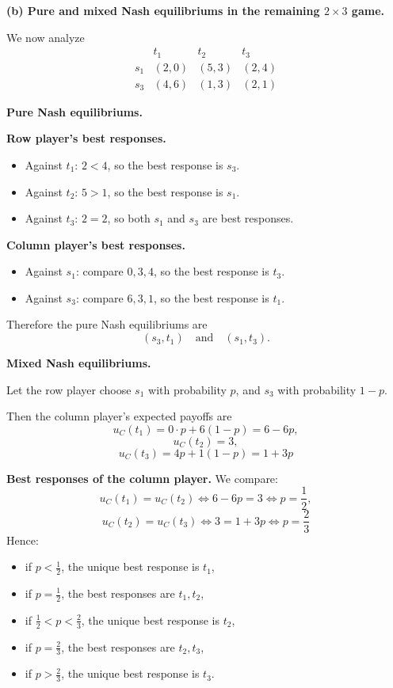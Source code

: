 \textbf{(b) Pure and mixed Nash equilibriums in the remaining \(2\times 3\) game.}

We now analyze
\[
\begin{array}{c|ccc}
 & t_1 & t_2 & t_3\\
\hline
s_1 & (2,0) & (5,3) & (2,4)\\
s_3 & (4,6) & (1,3) & (2,1)
\end{array}
\]

\textbf{Pure Nash equilibriums.}

\textbf{Row player's best responses.}
\begin{itemize}
\item Against \(t_1\): \(2<4\), so the best response is \(s_3\).
\item Against \(t_2\): \(5>1\), so the best response is \(s_1\).
\item Against \(t_3\): \(2=2\), so both \(s_1\) and \(s_3\) are best responses.
\end{itemize}

\textbf{Column player's best responses.}
\begin{itemize}
\item Against \(s_1\): compare \(0,3,4\), so the best response is \(t_3\).
\item Against \(s_3\): compare \(6,3,1\), so the best response is \(t_1\).
\end{itemize}

Therefore the pure Nash equilibriums are
\[
\boxed{(s_3,t_1)\quad \text{and}\quad (s_1,t_3).}
\]

\textbf{Mixed Nash equilibriums.}

Let the row player choose \(s_1\) with probability \(p\), and \(s_3\) with probability \(1-p\).

Then the column player's expected payoffs are
\[
u_C(t_1)=0\cdot p+6(1-p)=6-6p,
\]
\[
u_C(t_2)=3,
\]
\[
u_C(t_3)=4p+1(1-p)=1+3p
\]

\textbf{Best responses of the column player.}
We compare:
\[
u_C(t_1)=u_C(t_2) \iff 6-6p=3 \iff p=\frac12,
\]
\[
u_C(t_2)=u_C(t_3) \iff 3=1+3p \iff p=\frac23
\]
Hence:
\begin{itemize}
\item if \(p<\frac12\), the unique best response is \(t_1\),
\item if \(p=\frac12\), the best responses are \(t_1,t_2\),
\item if \(\frac12<p<\frac23\), the unique best response is \(t_2\),
\item if \(p=\frac23\), the best responses are \(t_2,t_3\),
\item if \(p>\frac23\), the unique best response is \(t_3\).
\end{itemize}

